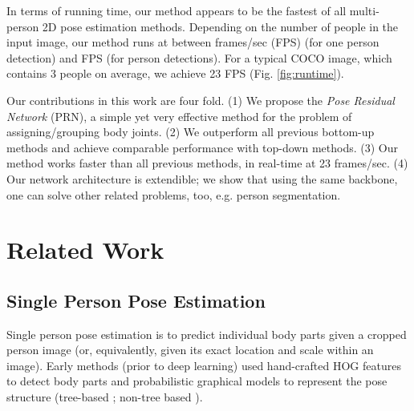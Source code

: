 \documentclass[runningheads]{llncs}
\begin{document}
In terms of running time, our method appears to be the fastest of all multi-person 2D pose estimation methods. Depending on the number of people in the input image, our method runs at between  frames/sec (FPS) (for one person detection) and  FPS (for  person detections). For a typical COCO image, which contains 3 people on average, we achieve 23 FPS (Fig. \ref{fig:runtime}). 


Our contributions in this work are four fold. (1) We propose the \textit{Pose Residual Network} (PRN), a simple yet very effective method for the problem of assigning/grouping body joints. (2) We outperform all previous bottom-up methods and achieve comparable performance with top-down methods. (3) Our method works faster than all previous methods, in real-time at 23 frames/sec. (4) Our network architecture is extendible; we show that using the same backbone, one can solve other related problems, too, e.g. person segmentation.
 
\section{Related Work}
\subsection{Single Person Pose Estimation}
Single person pose estimation is to predict individual body parts given  a cropped person image (or, equivalently, given its exact location and scale within an image). Early methods (prior to deep learning) used hand-crafted HOG features \cite{Dalal2005} to detect body parts and probabilistic graphical models to represent the pose structure (tree-based  \cite{Pishchulin2013,Yang2011,Johnson,Andriluka2009}; non-tree based \cite{Dantone2013,Gkioxari2014}). 
\end{document}
